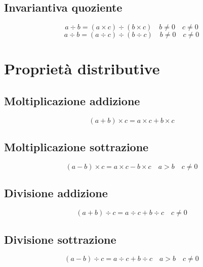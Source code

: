 \subsection{Invariantiva quoziente}
\begin{equation}
a\div b=(a\times c)\div (b\times c)\quad b\neq 0\quad c \neq 0
\end{equation}
\begin{equation}
a\div b=(a\div c)\div (b\div c)\quad b\neq 0\quad c \neq 0
\end{equation}
\section{Proprietà distributive}
\subsection{Moltiplicazione addizione}
\begin{equation}
(a+b)\times c=a\times c+b\times c
\end{equation}
\subsection{Moltiplicazione sottrazione}
\begin{equation}
(a-b)\times c=a\times c-b\times c\quad a>b\quad c\neq 0
\end{equation}
\subsection{Divisione addizione}
\begin{equation}
(a+b)\div c=a\div c+b\div c\quad c\neq 0
\end{equation}
\subsection{Divisione sottrazione}
\begin{equation}
(a-b)\div c=a\div c+b\div c\quad a>b\quad c\neq 0
\end{equation}
